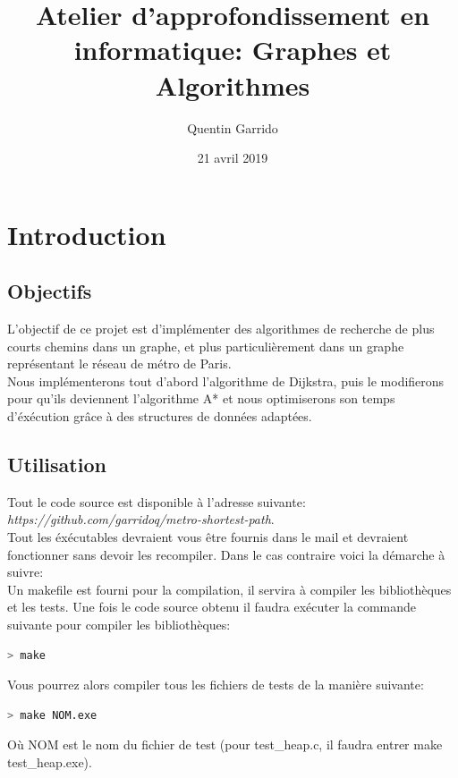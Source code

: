 \documentclass{article}
\title{Atelier d'approfondissement en informatique: Graphes et Algorithmes}
\author{Quentin Garrido}
\date{21 avril 2019}
\begin{document}
\maketitle
\tableofcontents
\pagebreak

\section{Introduction}
\subsection{Objectifs}

L'objectif de ce projet est d'implémenter des algorithmes de recherche de plus courts
chemins dans un graphe, et plus particulièrement dans un graphe représentant le réseau
de métro de Paris.\\
Nous implémenterons tout d'abord l'algorithme de Dijkstra, puis le modifierons pour
qu'ils deviennent l'algorithme A* et nous optimiserons son temps d'éxécution grâce
à des structures de données adaptées.

\subsection{Utilisation}

Tout le code source est disponible à l'adresse suivante: \textit{https://github.com/garridoq/metro-shortest-path}.\\

Tout les éxécutables devraient vous être fournis dans le mail et devraient fonctionner sans devoir
les recompiler. Dans le cas contraire voici la démarche à suivre:\\

Un makefile est fourni pour la compilation, il servira à compiler les bibliothèques et les tests.
Une fois le code source obtenu il faudra exécuter la commande suivante pour compiler les bibliothèques:
\begin{lstlisting}[language=bash]
	> make
\end{lstlisting}

Vous pourrez alors compiler tous les fichiers de tests de la manière suivante:
\begin{lstlisting}[language=bash]
	> make NOM.exe
\end{lstlisting}
Où NOM est le nom du fichier de test (pour test\_heap.c, il faudra entrer make test\_heap.exe).\\
\end{document}
